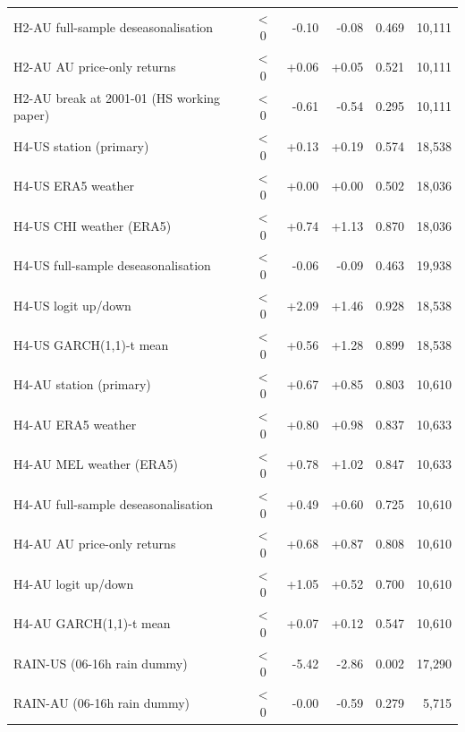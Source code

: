 \begin{table}[htbp]
\begin{tabular}{lcrrrr}
H2-AU full-sample deseasonalisation & $<$0 & -0.10 & -0.08 & 0.469 & 10,111 \\
H2-AU AU price-only returns & $<$0 & +0.06 & +0.05 & 0.521 & 10,111 \\
H2-AU break at 2001-01 (HS working paper) & $<$0 & -0.61 & -0.54 & 0.295 & 10,111 \\
H4-US station (primary) & $<$0 & +0.13 & +0.19 & 0.574 & 18,538 \\
H4-US ERA5 weather & $<$0 & +0.00 & +0.00 & 0.502 & 18,036 \\
H4-US CHI weather (ERA5) & $<$0 & +0.74 & +1.13 & 0.870 & 18,036 \\
H4-US full-sample deseasonalisation & $<$0 & -0.06 & -0.09 & 0.463 & 19,938 \\
H4-US logit up/down & $<$0 & +2.09 & +1.46 & 0.928 & 18,538 \\
H4-US GARCH(1,1)-t mean & $<$0 & +0.56 & +1.28 & 0.899 & 18,538 \\
H4-AU station (primary) & $<$0 & +0.67 & +0.85 & 0.803 & 10,610 \\
H4-AU ERA5 weather & $<$0 & +0.80 & +0.98 & 0.837 & 10,633 \\
H4-AU MEL weather (ERA5) & $<$0 & +0.78 & +1.02 & 0.847 & 10,633 \\
H4-AU full-sample deseasonalisation & $<$0 & +0.49 & +0.60 & 0.725 & 10,610 \\
H4-AU AU price-only returns & $<$0 & +0.68 & +0.87 & 0.808 & 10,610 \\
H4-AU logit up/down & $<$0 & +1.05 & +0.52 & 0.700 & 10,610 \\
H4-AU GARCH(1,1)-t mean & $<$0 & +0.07 & +0.12 & 0.547 & 10,610 \\
RAIN-US (06-16h rain dummy) & $<$0 & -5.42 & -2.86 & 0.002 & 17,290 \\
RAIN-AU (06-16h rain dummy) & $<$0 & -0.00 & -0.59 & 0.279 & 5,715 \\
\bottomrule\end{tabular}\end{table}
